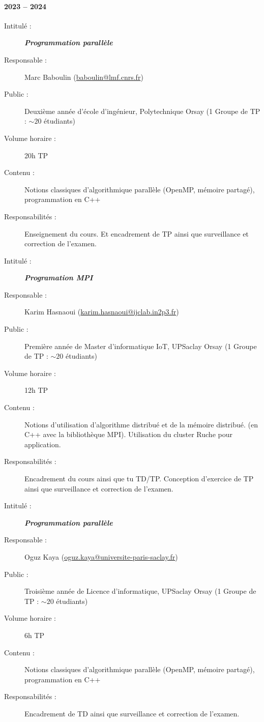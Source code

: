 \paragraph*{2023 -- 2024}
\begin{description}
      \item[Intitulé :] \textit{\textbf{Programmation parallèle}}
      \item[Responsable :] Marc Baboulin
            (\href{mailto:baboulin@lmf.cnrs.fr}{baboulin@lmf.cnrs.fr})
      \item[Public :] Deuxième année d'école d'ingénieur, Polytechnique Orsay (1 Groupe de
            TP : $\sim 20$ étudiants)
      \item[Volume horaire :] 20h TP
      \item[Contenu :] Notions classiques d'algorithmique parallèle (OpenMP, mémoire
            partagé), programmation en C++
      \item[Responsabilités :] Enseignement du cours. Et encadrement de TP ainsi que
            surveillance et correction de l'examen.
\end{description}

\begin{description}
      \item[Intitulé :] \textit{\textbf{Programation MPI}}
      \item[Responsable :] Karim Hasnaoui
            (\href{mailto:karim.hasnaoui@ijclab.in2p3.fr}{karim.hasnaoui@ijclab.in2p3.fr})
      \item[Public :] Première année de Master d'informatique IoT, UPSaclay Orsay (1 Groupe
            de TP : $\sim 20$ étudiants)
      \item[Volume horaire :] 12h TP
      \item[Contenu :] Notions d'utilisation d'algorithme distribué et de la mémoire
            distribué. (en C++ avec la bibliothèque MPI). Utilisation du cluster Ruche pour
            application.
      \item[Responsabilités :] Encadrement du cours ainsi que tu TD/TP. Conception
            d'exercice de TP ainsi que surveillance et correction de l'examen.
\end{description}

\begin{description}
      \item[Intitulé :] \textit{\textbf{Programmation parallèle}}
      \item[Responsable :] Oguz Kaya
            (\href{mailto:oguz.kaya@universite-paris-saclay.fr}{oguz.kaya@universite-paris-saclay.fr})
      \item[Public :] Troisième année de Licence d'informatique, UPSaclay Orsay (1 Groupe
            de TP : $\sim 20$ étudiants)
      \item[Volume horaire :] 6h TP
      \item[Contenu :] Notions classiques d'algorithmique parallèle (OpenMP, mémoire
            partagé), programmation en C++
      \item[Responsabilités :] Encadrement de TD ainsi que surveillance et correction de
            l'examen.
\end{description}

